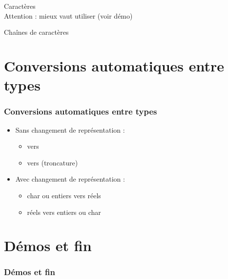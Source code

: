 \documentclass[xcolor=svgnames]{beamer}
\begin{document}
\begin{frame}
  
  \begin{block}{Caractères}
\\ \pause
    \alert{Attention :} mieux vaut utiliser 
    (voir démo)
  \end{block}\pause

\begin{block}{Chaînes de caractères}
\end{block}

\end{frame}

\pause
\section[Conversions]{Conversions automatiques entre types}
\begin{frame}
  \frametitle{Conversions  automatiques entre types}
  \begin{itemize}
\item Sans changement de représentation  :
  \begin{itemize}
    \item {} vers \pause
    \item {} vers  (troncature)
  \end{itemize}\pause
  \item Avec changement de représentation :
    \begin{itemize}
    \item char ou entiers vers réels
    \item réels vers entiers ou char
    \end{itemize}
  \end{itemize}
\end{frame}


\section[Démos]{Démos et fin}
\begin{frame}
  \frametitle{Démos et fin}
\end{frame}
\end{document}
